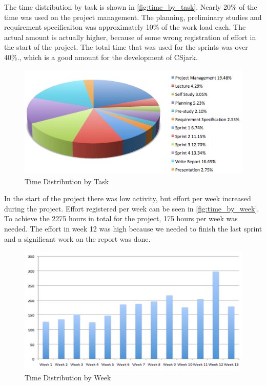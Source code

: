 The time distribution by task is shown in \autoref{fig:time_by_task}. Nearly 
20\% of the time was used on the project management. The planning, 
preliminary studies and requirement specificaiton was approximately 10\% of the work load
each. The actual amount is actually higher, because of some wrong registration of effort in the 
start of the project. The total time that was used for the sprints was over 
40\%., which is a good amount for the development of CSjark. 

\begin{figure}[htbp]
	\center
	\includegraphics[width=\textwidth]{./evaluation/img/piechart_time}
	\caption{Time Distribution by Task\label{fig:time_by_task}}
\end{figure}

In the start of the project there was low activity, but effort per week 
increased during the project. Effort registered per week can be seen in 
\autoref{fig:time_by_week}. To achieve the 2275 hours in total for the 
project, 175 hours per week was needed. The effort in week 12 was high because 
we needed to finish the last sprint and a significant work on the report was done.

\begin{figure}[htbp]
	\center
	\includegraphics[width=\textwidth]{./evaluation/img/columnchart_effort} 
	\caption{Time Distribution by Week\label{fig:time_by_week}}
\end{figure}


